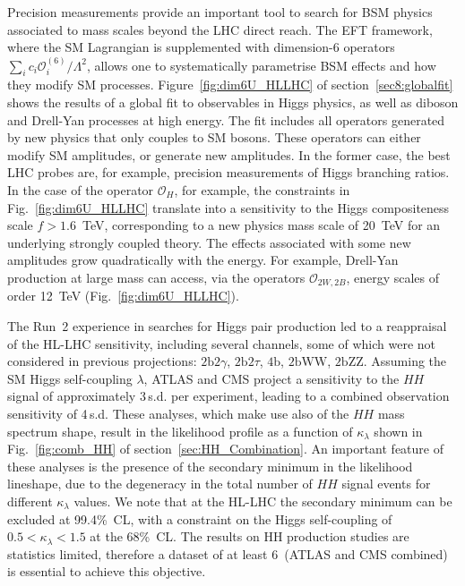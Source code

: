 \documentclass[../report.tex]{subfiles}
\begin{document}
Precision measurements provide an important tool to search for BSM physics associated to mass scales beyond the LHC direct reach. The EFT framework, where the SM Lagrangian is supplemented with dimension-6 operators $\sum_{i} c_i \mathcal{O}^{(6)}_i/\Lambda^2$, allows one to systematically parametrise BSM effects and how they modify SM processes. Figure~\ref{fig:dim6U_HLLHC} of section~\ref{sec8:globalfit} shows the results of a global fit  to observables in Higgs physics, as well as diboson and Drell-Yan processes at high energy. The fit includes all operators generated by new physics that only couples to SM bosons. These operators can either modify SM amplitudes, or generate new amplitudes. In the former case, the best LHC probes are, for example, precision measurements of Higgs branching ratios. In the case of the operator $\mathcal{O}_H$, 
for example, the constraints in Fig.~\ref{fig:dim6U_HLLHC} translate into a sensitivity to the Higgs compositeness scale $f>1.6$~TeV, corresponding to a new physics mass scale of 20~TeV for an underlying strongly coupled theory.
The effects associated with some new amplitudes grow quadratically with the energy. For example, Drell-Yan production at large mass can access, via the operators $\mathcal{O}_{2W,2B}$, energy scales of order 12~TeV (Fig.~\ref{fig:dim6U_HLLHC}). 

The Run~2 experience in searches for Higgs pair production led to a reappraisal of the HL-LHC sensitivity, including several channels, some of which were not considered in previous projections: $2\textrm{b}2\gamma$, $2\textrm{b}2\tau$, $4\textrm{b}$, $2\textrm{b}\textrm{WW}$, $2\textrm{b}\textrm{ZZ}$.
Assuming the SM Higgs self-coupling $\lambda$, ATLAS and CMS project a sensitivity to the $HH$ signal of approximately 3\,s.d. per experiment, leading to a combined observation sensitivity of 4\,s.d. These analyses, which make use also of the $HH$ mass spectrum shape, result in the likelihood profile as a function of $\kappa_{\lambda}$ shown in Fig.~\ref{fig:comb_HH} of section~\ref{sec:HH_Combination}. An important feature of these analyses is the presence of the secondary minimum in the likelihood lineshape, due to the degeneracy in the total number of $HH$ signal events for different $\kappa_{\lambda}$ values. We note that at the HL-LHC the secondary minimum can be excluded at 99.4\%~CL, with a constraint on the Higgs self-coupling of $0.5 < \kappa_{\lambda} < 1.5 $ at the 68\%\ CL. The results on HH production studies are statistics limited, therefore a dataset of at least 6\,\iab{}  (ATLAS and CMS combined) is essential to achieve this objective.
\end{document}

